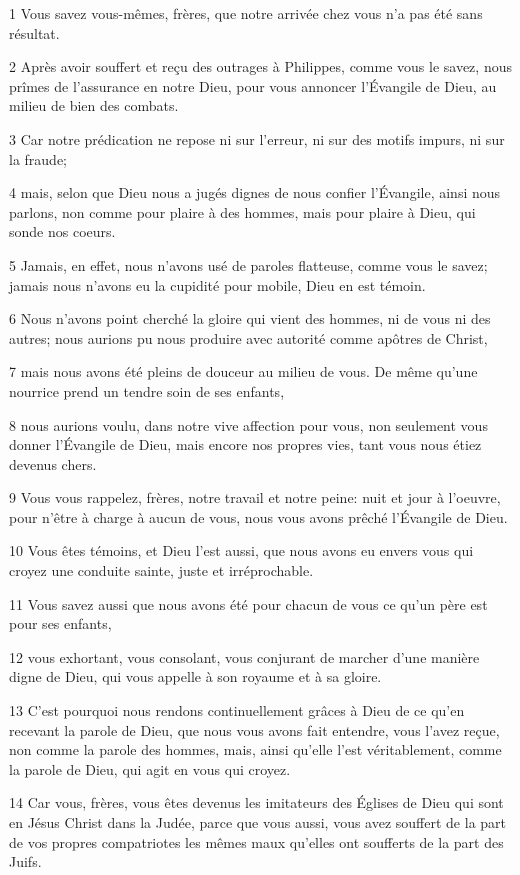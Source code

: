 \par 1 Vous savez vous-mêmes, frères, que notre arrivée chez vous n'a pas été sans résultat.
\par 2 Après avoir souffert et reçu des outrages à Philippes, comme vous le savez, nous prîmes de l'assurance en notre Dieu, pour vous annoncer l'Évangile de Dieu, au milieu de bien des combats.
\par 3 Car notre prédication ne repose ni sur l'erreur, ni sur des motifs impurs, ni sur la fraude;
\par 4 mais, selon que Dieu nous a jugés dignes de nous confier l'Évangile, ainsi nous parlons, non comme pour plaire à des hommes, mais pour plaire à Dieu, qui sonde nos coeurs.
\par 5 Jamais, en effet, nous n'avons usé de paroles flatteuse, comme vous le savez; jamais nous n'avons eu la cupidité pour mobile, Dieu en est témoin.
\par 6 Nous n'avons point cherché la gloire qui vient des hommes, ni de vous ni des autres; nous aurions pu nous produire avec autorité comme apôtres de Christ,
\par 7 mais nous avons été pleins de douceur au milieu de vous. De même qu'une nourrice prend un tendre soin de ses enfants,
\par 8 nous aurions voulu, dans notre vive affection pour vous, non seulement vous donner l'Évangile de Dieu, mais encore nos propres vies, tant vous nous étiez devenus chers.
\par 9 Vous vous rappelez, frères, notre travail et notre peine: nuit et jour à l'oeuvre, pour n'être à charge à aucun de vous, nous vous avons prêché l'Évangile de Dieu.
\par 10 Vous êtes témoins, et Dieu l'est aussi, que nous avons eu envers vous qui croyez une conduite sainte, juste et irréprochable.
\par 11 Vous savez aussi que nous avons été pour chacun de vous ce qu'un père est pour ses enfants,
\par 12 vous exhortant, vous consolant, vous conjurant de marcher d'une manière digne de Dieu, qui vous appelle à son royaume et à sa gloire.
\par 13 C'est pourquoi nous rendons continuellement grâces à Dieu de ce qu'en recevant la parole de Dieu, que nous vous avons fait entendre, vous l'avez reçue, non comme la parole des hommes, mais, ainsi qu'elle l'est véritablement, comme la parole de Dieu, qui agit en vous qui croyez.
\par 14 Car vous, frères, vous êtes devenus les imitateurs des Églises de Dieu qui sont en Jésus Christ dans la Judée, parce que vous aussi, vous avez souffert de la part de vos propres compatriotes les mêmes maux qu'elles ont soufferts de la part des Juifs.
